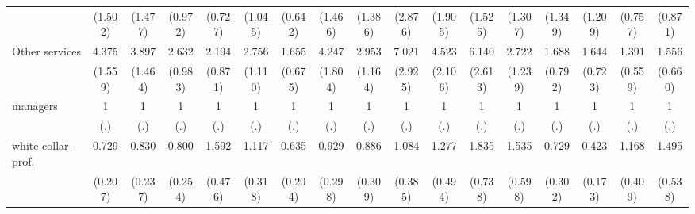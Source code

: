 {\begin{tabular}{l*{16}{c}}
                    &     (1.502)         &     (1.477)         &     (0.972)         &     (0.727)         &     (1.045)         &     (0.642)         &     (1.466)         &     (1.386)         &     (2.876)         &     (1.905)         &     (1.525)         &     (1.307)         &     (1.349)         &     (1.209)         &     (0.757)         &     (0.871)         \\
[1em]
Other services      &       4.375\sym{***}&       3.897\sym{***}&       2.632\sym{**} &       2.194\sym{*}  &       2.756\sym{*}  &       1.655         &       4.247\sym{***}&       2.953\sym{**} &       7.021\sym{***}&       4.523\sym{**} &       6.140\sym{***}&       2.722\sym{*}  &       1.688         &       1.644         &       1.391         &       1.556         \\
                    &     (1.559)         &     (1.464)         &     (0.983)         &     (0.871)         &     (1.110)         &     (0.675)         &     (1.804)         &     (1.164)         &     (2.925)         &     (2.106)         &     (2.613)         &     (1.239)         &     (0.792)         &     (0.723)         &     (0.559)         &     (0.660)         \\
[1em]
managers            &           1         &           1         &           1         &           1         &           1         &           1         &           1         &           1         &           1         &           1         &           1         &           1         &           1         &           1         &           1         &           1         \\
                    &         (.)         &         (.)         &         (.)         &         (.)         &         (.)         &         (.)         &         (.)         &         (.)         &         (.)         &         (.)         &         (.)         &         (.)         &         (.)         &         (.)         &         (.)         &         (.)         \\
[1em]
white collar - prof.&       0.729         &       0.830         &       0.800         &       1.592         &       1.117         &       0.635         &       0.929         &       0.886         &       1.084         &       1.277         &       1.835         &       1.535         &       0.729         &       0.423\sym{*}  &       1.168         &       1.495         \\
                    &     (0.207)         &     (0.237)         &     (0.254)         &     (0.476)         &     (0.318)         &     (0.204)         &     (0.298)         &     (0.309)         &     (0.385)         &     (0.494)         &     (0.738)         &     (0.598)         &     (0.302)         &     (0.173)         &     (0.409)         &     (0.538)         \\

\end{tabular}}
